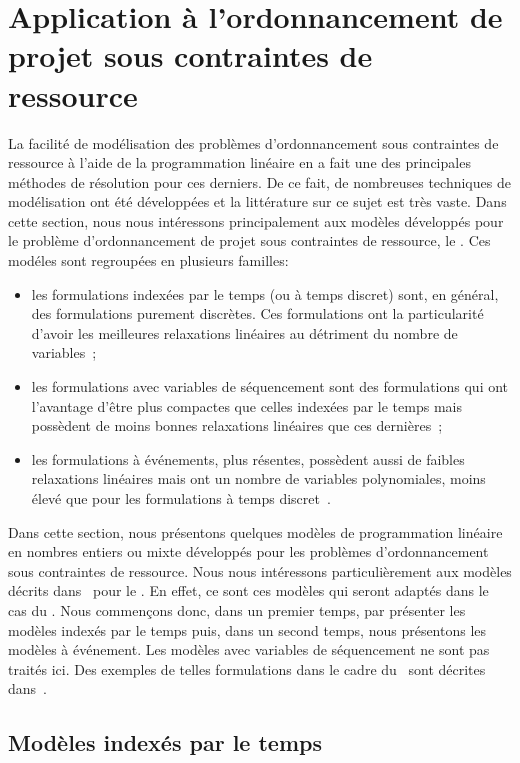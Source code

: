 \section{Application à l'ordonnancement de projet sous contraintes de
  ressource}   
\label{sec:PLNE_ordo_res}

La facilité de modélisation des problèmes d'ordonnancement sous
contraintes de ressource à l'aide de la programmation linéaire en a
fait une des principales méthodes de résolution pour ces
derniers. De ce fait, de nombreuses techniques de modélisation ont été
développées et la littérature sur ce sujet est très vaste. Dans cette
section, nous nous intéressons principalement aux modèles développés
pour le problème d'ordonnancement de projet sous contraintes de
ressource, le \RCPSP. Ces modéles sont regroupées en plusieurs
familles: 
\begin{itemize}
\item les formulations indexées par le temps (ou à temps discret)
sont, en général, des formulations purement discrètes. Ces
formulations ont la particularité d'avoir les meilleures relaxations
linéaires au détriment du nombre de
variables~\cite{CAVT,ex_RCPSP_discret};
\item les formulations avec variables de séquencement sont des
formulations qui ont l'avantage d'être plus compactes que celles
indexées par le temps mais possèdent de moins bonnes relaxations
linéaires que ces dernières~\cite{AVT,AMR};
\item les formulations à événements, plus résentes, possèdent aussi de
faibles relaxations linéaires mais ont un nombre de variables
polynomiales, moins élevé que pour les formulations à temps
discret~\cite{modele_RCPSP}.
\end{itemize}

Dans cette section, nous présentons quelques modèles de
programmation linéaire en nombres entiers ou mixte développés pour les
problèmes d'ordonnancement sous contraintes de ressource. Nous nous
intéressons particulièrement aux modèles décrits
dans~\cite{modele_RCPSP} pour le \RCPSP. En effet, ce sont ces modèles
qui seront adaptés dans le cas du \CECSP. Nous commençons donc, dans
un premier temps, par présenter les modèles indexés par le temps puis,
dans un second temps, nous présentons les modèles à événement. Les
modèles avec variables de séquencement ne sont pas traités ici. Des
exemples de telles formulations dans le cadre du \RCPSP~sont décrites
dans~\cite{ADN}.

\subsection{Modèles indexés par le temps}
\label{sec:time_RCPSP}

